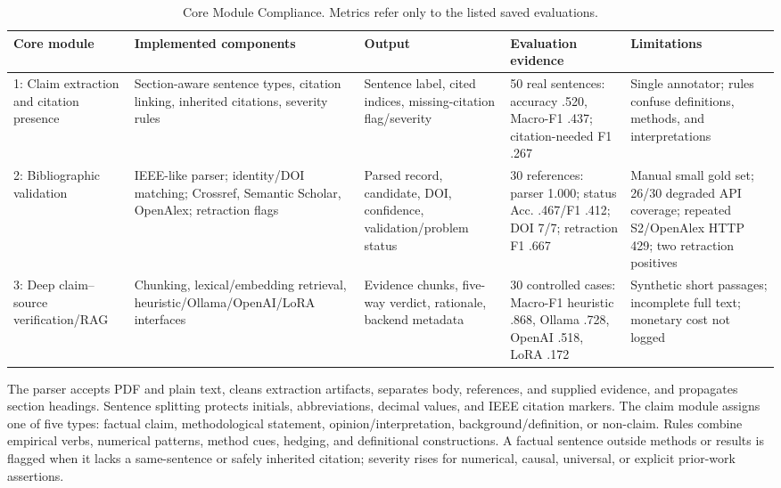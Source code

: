 \documentclass[12pt,toc=bib,toc=listof]{scrartcl}
\begin{document}
\begin{table}[H]
\centering
\scriptsize
\setlength{\tabcolsep}{3pt}
\begin{tabularx}{\textwidth}{@{}P{1.55cm}YYYY@{}}
\toprule
\textbf{Core module} & \textbf{Implemented components} & \textbf{Output} & \textbf{Evaluation evidence} & \textbf{Limitations} \\
: Claim extraction and citation presence & Section-aware sentence types, citation linking, inherited citations, severity rules & Sentence label, cited indices, missing-citation flag/severity & 50 real sentences: accuracy .520, Macro-F1 .437; citation-needed F1 .267 & Single annotator; rules confuse definitions, methods, and interpretations \\
2: Bibliographic validation & IEEE-like parser; identity/DOI matching; Crossref, Semantic Scholar, OpenAlex; retraction flags & Parsed record, candidate, DOI, confidence, validation/problem status & 30 references: parser 1.000; status Acc. .467/F1 .412; DOI 7/7; retraction F1 .667 & Manual small gold set; 26/30 degraded API coverage; repeated S2/OpenAlex HTTP 429; two retraction positives \\
3: Deep claim--source verification/RAG & Chunking, lexical/embedding retrieval, heuristic/Ollama/OpenAI/LoRA interfaces & Evidence chunks, five-way verdict, rationale, backend metadata & 30 controlled cases: Macro-F1 heuristic .868, Ollama .728, OpenAI .518, LoRA .172 & Synthetic short passages; incomplete full text; monetary cost not logged \\
\bottomrule
\end{tabularx}
\caption{Core Module Compliance. Metrics refer only to the listed saved evaluations.}
\label{tab:compliance}
\end{table}

The parser accepts PDF and plain text, cleans extraction artifacts, separates body, references, and supplied evidence, and propagates section headings. Sentence splitting protects initials, abbreviations, decimal values, and IEEE citation markers. The claim module assigns one of five types: factual claim, methodological statement, opinion/interpretation, background/definition, or non-claim. Rules combine empirical verbs, numerical patterns, method cues, hedging, and definitional constructions. A factual sentence outside methods or results is flagged when it lacks a same-sentence or safely inherited citation; severity rises for numerical, causal, universal, or explicit prior-work assertions.
\end{document}
